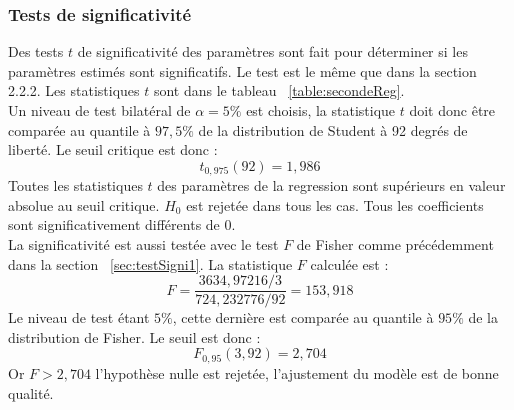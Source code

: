 \documentclass{article}
\begin{document}
\subsubsection{Tests de significativité}
Des tests $t$ de significativité des paramètres sont fait pour déterminer si les paramètres estimés sont significatifs. Le test est le même que dans la
section 2.2.2. Les statistiques $t$ sont dans le tableau ~\ref{table:secondeReg}.
\\
Un niveau de test bilatéral de $\alpha = 5 \%$ est choisis, la statistique  $t$ doit donc être comparée au quantile à  $97,5\%$ de la distribution de
Student à 92 degrés de liberté. Le seuil critique est donc :
\begin{equation*}
t_{0,975}(92) = 1,986
\end{equation*}
Toutes les statistiques $t$ des paramètres de la regression sont supérieurs en valeur absolue au seuil critique. $H_0$ est rejetée dans tous les cas.
Tous les coefficients sont significativement différents de 0.
\\
La significativité est aussi testée avec le test $F$ de Fisher comme précédemment dans la section ~\ref{sec:testSigni1}. La statistique $F$ calculée est :
\begin{equation*}
    F =  \frac{3634,97216/3}{724,232776/92} = 153,918
\end{equation*}
Le niveau de test étant $5\%$, cette dernière est comparée au quantile à $95\%$ de la distribution de Fisher. Le seuil est donc :
\begin{equation*}
    F_{0,95}(3,92) = 2,704
\end{equation*}
Or $F > 2,704$ l'hypothèse nulle est rejetée, l'ajustement du modèle est de bonne qualité.
\end{document}
